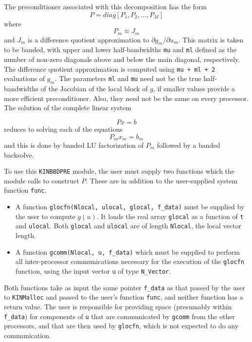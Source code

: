 The preconditioner associated with this decomposition has the form 
\begin{equation}
P= diag[P_1, P_2, \ldots, P_M]
\end{equation}
where 
\begin{equation}
P_m \approx J_m
\end{equation}
and $J_m$ is a difference quotient approximation to 
$\partial g_m/\partial u_m$. This matrix is taken to be banded, with
upper and lower half-bandwidths {\tt mu} and {\tt ml} defined as
the number of non-zero diagonals above and below the main diagonal,
respectively. The difference quotient approximation is computed using
{\tt mu + ml + 2} evaluations of $g_m$. The parameters {\tt ml} and
{\tt mu} need not be the true half-bandwidths of the Jacobian of the
local block of $g$, if smaller values provide a more efficient
preconditioner. Also, they need not be the same on every processor.
The solution of the complete linear system

\begin{equation}
Px = b
\end{equation}
reduces to solving each of the equations 
\begin{equation}
P_m x_m = b_m
\end{equation}
and this is done by banded LU factorization of $P_m$ followed by a banded
backsolve.

To use this {\tt KINBBDPRE} module, the user must supply two functions which 
the module calls to construct $P$. These are in addition to the user-supplied
system function {\tt func}.

\begin{itemize}

\item A function {\tt glocfn(Nlocal, ulocal, glocal, f\_data)} must
be supplied by the user to compute $g(u)$. It loads the real array
{\tt glocal} as a function of {\tt t} and {\tt ulocal}.  
Both {\tt glocal} and {\tt ulocal} are of length {\tt Nlocal}, the
local vector length.

\item  A function {\tt gcomm(Nlocal, u, f\_data)} which must be supplied to
perform all inter-processor communications necessary for the execution of
the {\tt glocfn} function, using the input vector {\tt u} of type 
{\tt N\_Vector}.
\end{itemize}

Both functions take as input the same pointer {\tt f\_data} as that passed
by the user to {\tt KINMalloc} and passed to the user's function {\tt func},
and neither function has a return value. The user is responsible for
providing space (presumably within {\tt f\_data}) for components of {\tt u}
that are communicated by {\tt gcomm} from the other processors, and that are
then used by {\tt glocfn}, which is not expected to do any communication.

